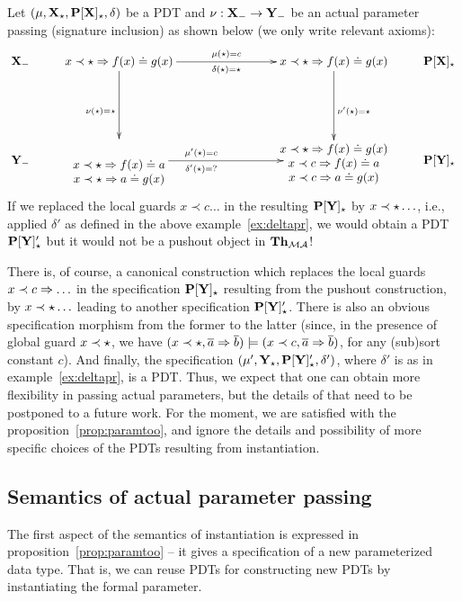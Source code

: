 \begin{example}Let $\pdt$ be a PDT and $\nu:\thr{X}_\weak\to\thr{Y_\weak}$ be
an actual parameter passing (signature inclusion) as shown below (we only write relevant axioms):
\[ \xymatrix{
\thr{X_\weak} &
x\prec \cons\To f(x)\eleq g(x) \ar[rrr]^{\mu(\cons)=c}_{\delta(\cons)=\cons} \ar[dd]_{\nu(\cons)=\cons}
	&&& x\prec \cons\To f(x)\eleq g(x) \ar[dd]^{\nu'(\cons)=\cons}	& \thr{P[X]_\cons}\\
	\\
\thr{Y_\weak}& 
\txt{\ \\ \ \\$x\prec \cons\To f(x)\eleq a$\\ $x\prec\cons\To a\eleq g(x)$}
	\ar[rrr]-<1.5cm,0cm>^{\mu'(\cons)=c}_{\delta'(\cons)=?}
	&&& \txt{$x\prec \cons\To f(x)\eleq g(x)$\\$x\prec c\To f(x)\eleq
	a$\\$x\prec c\To a\eleq g(x)$} & \thr{P[Y]_\cons}
}
\]
If we replaced the local guards $x\prec c\ldots$ in the resulting
$\thr{P[Y]_\cons}$ by $x\prec\cons\ldots$, i.e.,
applied $\delta'$ as defined in the above example~\ref{ex:deltapr}, we
would obtain a PDT $\thr{P[Y]'_\cons}$ but it would not be a pushout object in $\ThMA$! 
\end{example}
There is, of course, a canonical construction which replaces the local guards $x\prec
c\To\ldots$ in the specification $\thr{P[Y]_\cons}$ resulting  from the
pushout construction, by $x\prec\cons\ldots$ leading to another specification
$\thr{P[Y]'_\cons}$. There is also an obvious specification morphism
from the former to the latter
 (since, in the presence of global guard $x\prec \cons$, we have
$(x\prec\cons,\ovr{a}\To \ovr{b})\models (x\prec c,\ovr{a}\To \ovr{b})$, for
any (sub)sort constant  $c$).
And finally, the specification $\pdtsp{\mu'}{\delta'}{\thr{Y_\cons}}{\thr{P[Y]'_\cons}}$, where
$\delta'$ is as in example~\ref{ex:deltapr}, is a PDT. 
Thus, we expect that one can obtain more flexibility in passing actual
parameters, but the details of that need to be postponed to a future work. 
For the
moment, we are satisfied with the proposition~\ref{prop:paramtoo}, and ignore the details
and possibility of more specific choices of the PDTs resulting from instantiation.


\subsection{Semantics of actual parameter passing}\label{sub:appsem}
The first aspect of the semantics of instantiation is expressed in
proposition~\ref{prop:paramtoo} -- it gives a specification of a new parameterized
data type. That is, we can reuse PDTs for constructing new PDTs by 
instantiating the formal parameter. 

